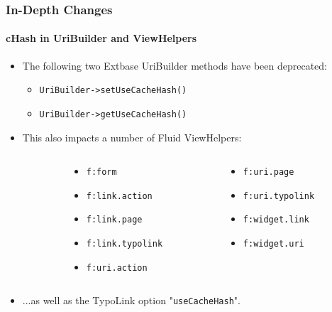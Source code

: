 \begin{frame}[fragile]
	\frametitle{In-Depth Changes}
	\framesubtitle{cHash in UriBuilder and ViewHelpers}

	\lstset{basicstyle=\smaller\ttfamily}

	\begin{itemize}
		\item The following two Extbase UriBuilder methods have been deprecated:

			\begin{itemize}
				\item \texttt{UriBuilder->setUseCacheHash()}
				\item \texttt{UriBuilder->getUseCacheHash()}
			\end{itemize}

		\item This also impacts a number of Fluid ViewHelpers:
	\end{itemize}
	\begin{columns}[T]
		\begin{column}{.05\textwidth}
		\end{column}
		\begin{column}{.45\textwidth}
			\begin{itemize}\smaller
				\item \texttt{f:form}
				\item \texttt{f:link.action}
				\item \texttt{f:link.page}
				\item \texttt{f:link.typolink}
				\item \texttt{f:uri.action}
			\end{itemize}\normalsize
		\end{column}
		\begin{column}{.45\textwidth}
			\begin{itemize}\smaller
				\item \texttt{f:uri.page}
				\item \texttt{f:uri.typolink}
				\item \texttt{f:widget.link}
				\item \texttt{f:widget.uri}
			\end{itemize}\normalsize
		\end{column}
	\end{columns}
	\vspace{0.2cm}
	\begin{itemize}
		\item ...as well as the TypoLink option "\texttt{useCacheHash}".
	\end{itemize}

\end{frame}

